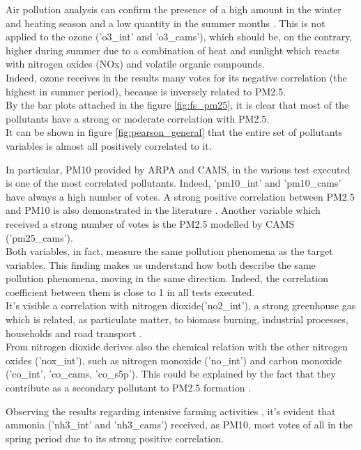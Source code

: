 Air pollution analysis can confirm the presence of a high amount in the winter and heating season and a low quantity in the summer months \cite{cichowicz2017dispersion}. This is not applied to the ozone ('o3\_int' and 'o3\_cams'), which should be, on the contrary, higher during summer due to a combination of heat and sunlight which reacts with nitrogen oxides (NOx) and volatile organic compounds.\\
Indeed, ozone receives in the results many votes for its negative correlation (the highest in summer period), because is inversely related to PM2.5.\\
By the bar plots attached in the figure \ref{fig:fs_pm25}, it is clear that most of the pollutants have a strong or moderate correlation with PM2.5. \\
It can be shown in figure \ref{fig:pearson_general} that the entire set of pollutants variables is almost all positively correlated to it.\par
In particular, PM10 provided by ARPA and CAMS, in the various test executed is one of the most correlated pollutants. Indeed, 'pm10\_int' and 'pm10\_cams' have always a high number of votes. 
A strong positive correlation between PM2.5 and PM10 is also demonstrated in the literature \cite{zhou2016concentrations}.
Another variable which received a strong number of votes is the PM2.5 modelled by CAMS ('pm25\_cams'). \\
Both variables, in fact, measure the same pollution phenomena as the target variables. This finding makes us understand how both describe the same pollution phenomena, moving in the same direction. Indeed, the correlation coefficient between them is close to 1 in all tests executed.\\
It's visible a correlation with nitrogen dioxide('no2\_int'), a strong greenhouse gas which is related, as particulate matter, to biomass burning, industrial processes, households and road transport \cite{zellner2000john} \cite{maranzano2022air}.\\
From nitrogen dioxide derives also the chemical relation with the other nitrogen oxides ('nox\_int'), such as nitrogen monoxide ('no\_int') and carbon monoxide ('co\_int', 'co\_cams, 'co\_s5p'). This could be explained by the fact that they contribute as a secondary pollutant to PM2.5 formation \cite{xie2015spatiotemporal}.
\par
Observing the results regarding intensive farming activities , it's evident that ammonia ('nh3\_int' and 'nh3\_cams') received, as PM10, most votes of all in the spring period due to its strong positive correlation. \\
